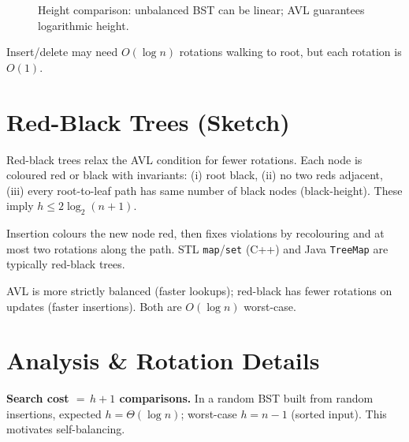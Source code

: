 \begin{figure}[h]
\centering
{}
\caption{Height comparison: unbalanced BST can be linear; AVL guarantees logarithmic height.}
\label{fig:avl-height}
\end{figure}

Insert/delete may need $O(\log n)$ rotations walking to root, but each rotation is $O(1)$.

\section{Red-Black Trees (Sketch)}
\label{sec:red-black}
Red-black trees relax the AVL condition for fewer rotations. Each node is coloured red or black with invariants: (i) root black, (ii) no two reds adjacent, (iii) every root-to-leaf path has same number of black nodes (black-height). These imply $h\le2\log_{2}(n+1)$.

Insertion colours the new node red, then fixes violations by recolouring and at most two rotations along the path. STL \texttt{map}/\texttt{set} (C++) and Java \texttt{TreeMap} are typically red-black trees.

AVL is more strictly balanced (faster lookups); red-black has fewer rotations on updates (faster insertions). Both are $O(\log n)$ worst-case.


\section{Analysis \& Rotation Details}
\label{sec:bst-analysis}
\textbf{Search cost $=\,h+1$ comparisons.} In a random BST built from random insertions, expected $h=\Theta(\log n)$; worst-case $h=n-1$ (sorted input). This motivates self-balancing.

